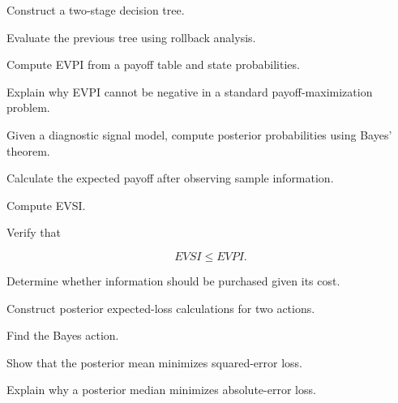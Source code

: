 \begin{exercise}[3]
Construct a two-stage decision tree.
\end{exercise}

\begin{exercise}[3]
Evaluate the previous tree using rollback analysis.
\end{exercise}

\begin{exercise}[3]
Compute EVPI from a payoff table and state probabilities.
\end{exercise}

\begin{exercise}[3]
Explain why EVPI cannot be negative in a standard payoff-maximization
problem.
\end{exercise}

\begin{exercise}[3]
Given a diagnostic signal model, compute posterior probabilities using
Bayes' theorem.
\end{exercise}

\begin{exercise}[3]
Calculate the expected payoff after observing sample information.
\end{exercise}

\begin{exercise}[3]
Compute EVSI.
\end{exercise}

\begin{exercise}[3]
Verify that

\[
EVSI\leq EVPI.
\]
\end{exercise}

\begin{exercise}[3]
Determine whether information should be purchased given its cost.
\end{exercise}

\begin{exercise}[3]
Construct posterior expected-loss calculations for two actions.
\end{exercise}

\begin{exercise}[3]
Find the Bayes action.
\end{exercise}

\begin{exercise}[3]
Show that the posterior mean minimizes squared-error loss.
\end{exercise}

\begin{exercise}[3]
Explain why a posterior median minimizes absolute-error loss.
\end{exercise}

